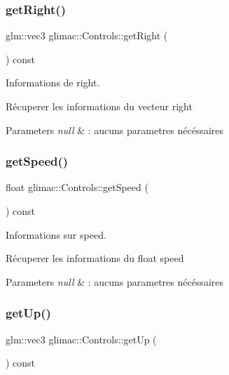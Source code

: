 \subsubsection{\texorpdfstring{get\+Right()}{getRight()}}
{\footnotesize\ttfamily glm\+::vec3 glimac\+::\+Controls\+::get\+Right (\begin{DoxyParamCaption}{ }\end{DoxyParamCaption}) const}



Informations de right. 

Récuperer les informations du vecteur right


\begin{DoxyParams}{Parameters}
{\em null} & \+: aucuns parametres nécéssaires \\
\hline
\end{DoxyParams}
\mbox{\label{classglimac_1_1Controls_ae6169e82a96b77cff9b578d6ed7afab0}} 
\subsubsection{\texorpdfstring{get\+Speed()}{getSpeed()}}
{\footnotesize\ttfamily float glimac\+::\+Controls\+::get\+Speed (\begin{DoxyParamCaption}{ }\end{DoxyParamCaption}) const}



Informations sur speed. 

Récuperer les informations du float speed


\begin{DoxyParams}{Parameters}
{\em null} & \+: aucuns parametres nécéssaires \\
\hline
\end{DoxyParams}
\mbox{\label{classglimac_1_1Controls_a7b4c48586aef21ae566fc8d60e69d220}} 
\subsubsection{\texorpdfstring{get\+Up()}{getUp()}}
{\footnotesize\ttfamily glm\+::vec3 glimac\+::\+Controls\+::get\+Up (\begin{DoxyParamCaption}{ }\end{DoxyParamCaption}) const}



